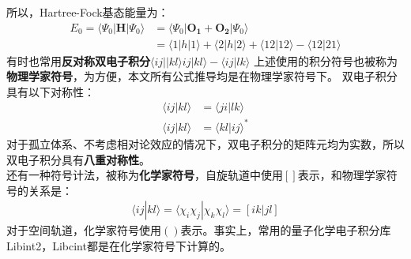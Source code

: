 \documentclass[12pt, a4paper, oneside]{ctexart}
\begin{document}
所以，Hartree-Fock基态能量为：
\begin{equation}
\begin{aligned}
E_0=\langle\Psi_0|\mathbf{H}|\Psi_0\rangle&=\langle\Psi_0|\mathbf{O_1}+\mathbf{O_2}|\Psi_0\rangle\\
  										  &=\langle 1|h|1\rangle+\langle 2|h|2\rangle+\langle 12|12\rangle-\langle 12|21\rangle
\end{aligned}
\end{equation}
有时也常用\textbf{反对称双电子积分}$\langle ij||kl\rangle ij|kl\rangle-\langle ij|lk\rangle$
上述使用的积分符号也被称为\textbf{物理学家符号}，为方便，本文所有公式推导均是在物理学家符号下。
双电子积分具有以下对称性：
\begin{equation}
\begin{aligned}
\langle ij|kl\rangle&=\langle ji|lk\rangle\\
\langle ij|kl \rangle&=\langle kl|ij\rangle^*
\end{aligned}
\end{equation}
对于孤立体系、不考虑相对论效应的情况下，双电子积分的矩阵元均为实数，所以双电子积分具有\textbf{八重对称性}。\\
还有一种符号计法，被称为\textbf{化学家符号}，自旋轨道中使用$[]$表示，和物理学家符号的关系是：
\begin{equation}
\begin{aligned}
\langle ij|kl\rangle = \langle \chi_i\chi_j|\chi_k\chi_l\rangle = [ik|jl]
\end{aligned}
\end{equation}
对于空间轨道，化学家符号使用$()$表示。事实上，常用的量子化学电子积分库Libint2，Libcint都是在化学家符号下计算的。
\end{document}
